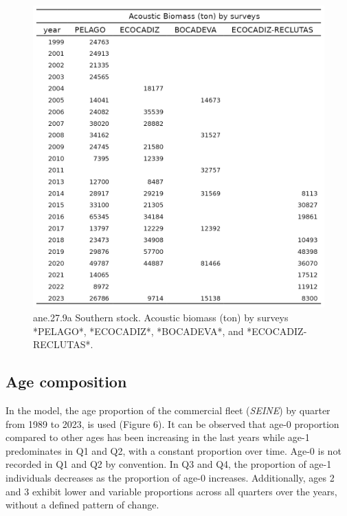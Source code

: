 \documentclass[
]{article}
\begin{document}
\begin{figure}[H]

{\centering \includegraphics[width=0.95\linewidth]{report/run/S1.0_4FLEETS_SelECO_RecIndex_Mnewfix/tb_index} 

}

\caption{ane.27.9a Southern stock. Acoustic biomass (ton) by surveys *PELAGO*, *ECOCADIZ*, *BOCADEVA*, and *ECOCADIZ-RECLUTAS*.   }\label{fig:unnamed-chunk-6}
\end{figure}

\hypertarget{age-composition}{%
\subsection{Age composition}\label{age-composition}}

In the model, the age proportion of the commercial fleet (\emph{SEINE})
by quarter from 1989 to 2023, is used (Figure 6). It can be observed
that age-0 proportion compared to other ages has been increasing in the
last years while age-1 predominates in Q1 and Q2, with a constant
proportion over time. Age-0 is not recorded in Q1 and Q2 by convention.
In Q3 and Q4, the proportion of age-1 individuals decreases as the
proportion of age-0 increases. Additionally, ages 2 and 3 exhibit lower
and variable proportions across all quarters over the years, without a
defined pattern of change.
\end{document}
